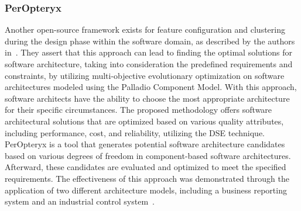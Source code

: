 \subsubsection{PerOpteryx} %
Another open-source framework exists for feature configuration and clustering during the design phase within the software domain, as described by the authors in~\cite{koziolek2011peropteryx}. They assert that this approach can lead to finding the optimal solutions for software architecture, taking into consideration the predefined requirements and constraints, by utilizing multi-objective evolutionary optimization on software architectures modeled using the Palladio Component Model. With this approach, software architects have the ability to choose the most appropriate architecture for their specific circumstances.
The proposed methodology offers software architectural solutions that are optimized based on various quality attributes, including performance, cost, and reliability, utilizing the DSE technique.
PerOpteryx is a tool that generates potential software architecture candidates based on various degrees of freedom in component-based software architectures. Afterward, these candidates are evaluated and optimized to meet the specified requirements. The effectiveness of this approach was demonstrated through the application of two different architecture models, including a business reporting system and an industrial control system~\cite{busch2019peropteryx}.


